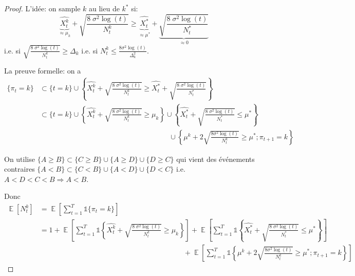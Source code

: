 \documentclass{article}
\DeclareMathOperator*{\E}{\mathbb{E}}
\theoremstyle{remark}
\theoremstyle{remark}
\begin{document}
\begin{proof}
   L'idée: on sample $k$ au lieu de $k^*$ si:
   $$
   \underbrace{\widehat{X_t^k}}_{\approx \mu_k} + \sqrt{\frac{8 \; \sigma^2 \log(t)}{N_t^k}} \geq  \underbrace{\widehat{X_t^*}}_{\approx \mu^*} + \underbrace{\sqrt{\frac{8 \; \sigma^2 \log(t)}{N_t^*}}}_{\approx 0}
   $$
   i.e. si $\sqrt{\frac{8 \; \sigma^2 \log(t)}{N_t^k}} \geq \Delta_k$ i.e. si $N_t^k \leq \frac{8 \sigma^2 \log(t)}{\Delta_k^2}$.

   La preuve formelle: on a
   \begin{align*}
      \{\pi_t=k\} &\subset \{t=k\}\cup\left\{ \widehat{X_t^k} + \sqrt{\frac{8 \; \sigma^2 \log(t)}{N_t^k}} \geq  \widehat{X_t^*} + \sqrt{\frac{8 \; \sigma^2 \log(t)}{N_t^*}} \right\} \\
      &\subset \{t=k\}\cup\left\{ \widehat{X_t^k} + \sqrt{\frac{8 \; \sigma^2 \log(t)}{N_t^k}} \geq \mu_k\right\} \cup \left\{ \widehat{X_t^*} + \sqrt{\frac{8 \; \sigma^2 \log(t)}{N_t^*}} \leq \mu^* \right\} \\
      & \quad \quad \quad \quad \quad \quad \quad \quad \quad \quad \quad \quad \quad \quad \quad \quad \quad \quad \cup \left\{ \mu^k + 2 \sqrt{\frac{8 \sigma^2 \log(t)}{N_t^k}} \geq \mu^* ; \pi_{t+1} = k \right\}
   \end{align*}

   On utilise $\{A \geq B\} \subset \{C \geq B\} \cup \{A \geq D\} \cup \{D \geq C\}$ qui vient des événements contraires $\{A < B\} \subset \{C < B\} \cup \{A < D\} \cup \{D < C\}$ i.e. $A<D<C<B \Rightarrow A<B$.

   Donc
   \begin{align*}
      \E[N_t^k] &= \E\left[ \sum_{t=1}^T \mathbb{1}\{\pi_t=k\} \right] \\
      &= 1 + \E\left[ \sum_{t=1}^T \mathbb{1}\left\{ \widehat{X_t^k} + \sqrt{\frac{8 \; \sigma^2 \log(t)}{N_t^k}} \geq \mu_k\right\}\right]  + \E\left[ \sum_{t=1}^T \mathbb{1}\left\{ \widehat{X_t^*} + \sqrt{\frac{8 \; \sigma^2 \log(t)}{N_t^*}} \leq \mu^* \right\} \right] \\
      & \quad \quad \quad \quad \quad \quad \quad \quad \quad \quad \quad \quad \quad \quad \quad \quad \quad \quad \quad \quad + \E\left[ \sum_{t=1}^T \mathbb{1}\left\{ \mu^k + 2 \sqrt{\frac{8 \sigma^2 \log(t)}{N_t^k}} \geq \mu^* ; \pi_{t+1} = k \right\} \right]
   \end{align*}


\end{proof}
\end{document}
